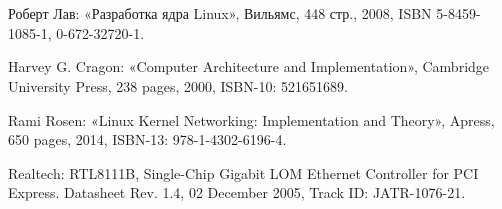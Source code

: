 \newpage
\section*{}

\begin{thebibliography}{00}

 Роберт Лав: «Разработка ядра Linux», Вильямс, 448 стр., 2008, ISBN
5-8459-1085-1, 0-672-32720-1.

 Harvey G. Cragon: «Computer Architecture and Implementation», Cambridge University Press, 238 pages, 2000, ISBN-10: 521651689.

 Rami Rosen: «Linux Kernel Networking: Implementation and Theory», Apress, 650 pages, 2014, ISBN-13: 978-1-4302-6196-4.

 Realtech: RTL8111B, Single-Chip Gigabit LOM Ethernet Controller for PCI Express. Datasheet Rev. 1.4, 02 December 2005, Track ID: JATR-1076-21.

\end{thebibliography}